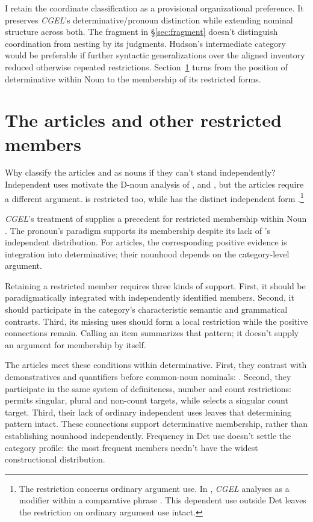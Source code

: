 \documentclass[12pt]{article}
\begin{document}
I retain the coordinate classification as a provisional organizational preference. It preserves \textit{CGEL}'s determinative/pronoun distinction while extending nominal structure across both. The fragment in §\ref{sec:fragment} doesn't distinguish coordination from nesting by its judgments. Hudson's intermediate category would be preferable if further syntactic generalizations over the aligned inventory reduced otherwise repeated restrictions. Section~\ref{sec:articles} turns from the position of determinative within Noun to the membership of its restricted forms.

\section{The articles and other restricted members}\label{sec:articles}

Why classify the articles  and  as nouns if they can't stand independently? Independent uses motivate the D-noun analysis of ,  and , but the articles require a different argument.  is restricted too, while  has the distinct independent form  \citep[371--372, 410--411]{huddleston2002}.\footnote{The restriction concerns ordinary argument use. In , \textit{CGEL} analyses  as a modifier within a comparative phrase \citep[1131--1132, 1135--1136]{huddleston2002}. This dependent use outside Det leaves the restriction on ordinary argument use intact.}

\textit{CGEL}'s treatment of  supplies a precedent for restricted membership within Noun \citep[470--471]{huddleston2002}. The pronoun's paradigm supports its membership despite its lack of 's independent distribution. For articles, the corresponding positive evidence is integration into determinative; their nounhood depends on the category-level argument.

Retaining a restricted member requires three kinds of support. First, it should be paradigmatically integrated with independently identified members. Second, it should participate in the category's characteristic semantic and grammatical contrasts. Third, its missing uses should form a local restriction while the positive connections remain. Calling an item  summarizes that pattern; it doesn't supply an argument for membership by itself.

The articles meet these conditions within determinative. First, they contrast with demonstratives and quantifiers before common-noun nominals: . Second, they participate in the same system of definiteness, number and count restrictions:  permits singular, plural and non-count targets, while  selects a singular count target. Third, their lack of ordinary independent uses leaves that determining pattern intact. These connections support determinative membership, rather than establishing nounhood independently. Frequency in Det use doesn't settle the category profile: the most frequent members needn't have the widest constructional distribution.
\end{document}
